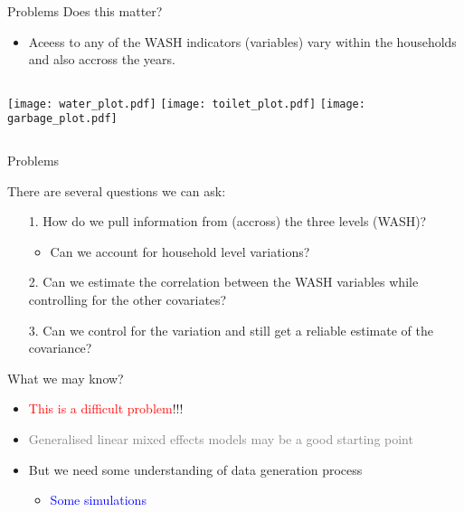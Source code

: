 \documentclass{beamer}
\begin{document}
\begin{frame}{Problems}
Does this matter?

\begin{itemize}[<+->]
\item Aceess to any of the WASH indicators (variables) vary within the households and also accross the years.
\end{itemize}
\pause
\begin{columns}[t]
\texttt{[image: water\_plot.pdf]}
\pause
{}
\texttt{[image: toilet\_plot.pdf]}
\pause
{}
\texttt{[image: garbage\_plot.pdf]}
\end{columns}
\end{frame}

\begin{frame}{Problems}

There are several questions we can ask:
\begin{itemize}[<+->]
\item[1.] How do we pull information from (accross) the three levels (WASH)?
\begin{itemize}[<+->]
\item Can we account for household level variations?
\end{itemize}
\item[2.] Can we estimate the correlation between the WASH variables while controlling for the other covariates?
\item[3.] Can we control for the variation and still get a reliable estimate of the covariance?
\end{itemize}

\pause
What we may know?
\begin{itemize}[<+->]
\item \textcolor{red}{This is a difficult problem}!!!
\item \textcolor{gray}{Generalised linear mixed effects models may be a good starting point}
\item But we need some understanding of data generation process
\begin{itemize}[<+->]
\item \textcolor{blue}{Some simulations}
\end{itemize}
\end{itemize}

\end{frame}
\end{document}
